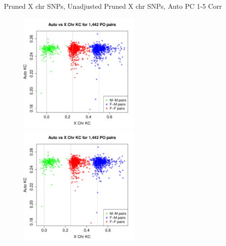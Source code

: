 \documentclass{beamer}
\begin{document}
\begin{frame}
\footnotesize 
Pruned X chr SNPs, Unadjusted \hspace{1cm} Pruned X chr SNPs, Auto PC 1-5 Corr
\centering
\begin{figure}
\includegraphics[height=6cm]{../kc_xPrunedvsAuto_poPairs_unadj.pdf}
\includegraphics[height=6cm]{../kc_xPrunedvsAuto_poPairs_autoPC15adj.pdf}
\end{figure}
\end{frame}
\end{document}
